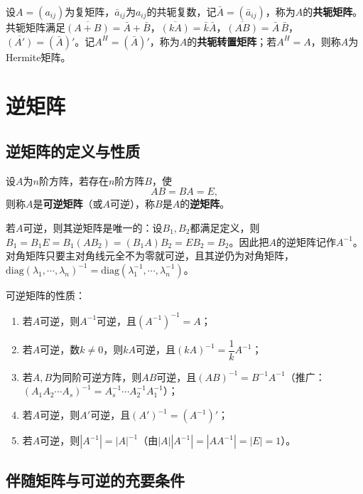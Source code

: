 设$A=(a_{ij})$为复矩阵，$\bar a_{ij}$为$a_{ij}$的共轭复数，记$\bar A=(\bar a_{ij})$，称为$A$的\textbf{共轭矩阵}。共轭矩阵满足$\overline{(A+B)}=\bar A+\bar B$，$\overline{(kA)}=\bar k\bar A$，$\overline{(AB)}=\bar A\,\bar B$，$\overline{(A')}=(\bar A)'$。记$A^{H}=(\bar A)'$，称为$A$的\textbf{共轭转置矩阵}；若$A^{H}=A$，则称$A$为Hermite矩阵。

\section{逆矩阵}

\subsection{逆矩阵的定义与性质}

\begin{definition}
设$A$为$n$阶方阵，若存在$n$阶方阵$B$，使
\[
AB=BA=E,
\]
则称$A$是\textbf{可逆矩阵}（或$A$可逆），称$B$是$A$的\textbf{逆矩阵}。
\end{definition}

若$A$可逆，则其逆矩阵是唯一的：设$B_1,B_2$都满足定义，则$B_1=B_1E=B_1(AB_2)=(B_1A)B_2=EB_2=B_2$。因此把$A$的逆矩阵记作$A^{-1}$。对角矩阵只要主对角线元全不为零就可逆，且其逆仍为对角矩阵，$\mathrm{diag}(\lambda_1,\cdots,\lambda_n)^{-1}=\mathrm{diag}(\lambda_1^{-1},\cdots,\lambda_n^{-1})$。

可逆矩阵的性质：
\begin{enumerate}
\item 若$A$可逆，则$A^{-1}$可逆，且$(A^{-1})^{-1}=A$；
\item 若$A$可逆，数$k\neq0$，则$kA$可逆，且$(kA)^{-1}=\dfrac{1}{k}A^{-1}$；
\item 若$A,B$为同阶可逆方阵，则$AB$可逆，且$(AB)^{-1}=B^{-1}A^{-1}$（推广：$(A_1A_2\cdots A_s)^{-1}=A_s^{-1}\cdots A_2^{-1}A_1^{-1}$）；
\item 若$A$可逆，则$A'$可逆，且$(A')^{-1}=(A^{-1})'$；
\item 若$A$可逆，则$|A^{-1}|=|A|^{-1}$（由$|A||A^{-1}|=|AA^{-1}|=|E|=1$）。
\end{enumerate}


\subsection{伴随矩阵与可逆的充要条件}

